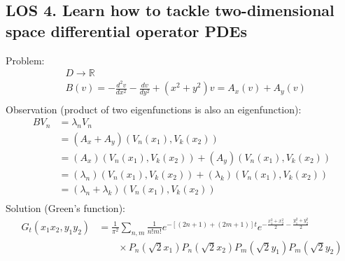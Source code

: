 \documentclass[12pt, a4paper]{article}
\begin{document}
\subsection*{LOS 4. Learn how to tackle two-dimensional space differential operator PDEs}
Problem:
\begin{align*}
    &D \rightarrow \mathbb{R}\\
    &B(v) = -\frac{d^2v}{dx^2}-\frac{dv}{dy^2} + (x^2+y^2)v = A_x(v) +  A_y(v)\\
\end{align*}
Observation (product of two eigenfunctions is also an  eigenfunction):
\begin{align*}
    BV_n &= \lambda_n  V_n\\
    &=(A_x +  A_y)(V_n(x_1), V_k(x_2))\\
    &=(A_x)(V_n(x_1), V_k(x_2)) + (A_y)(V_n(x_1), V_k(x_2))\\
    &=(\lambda_n)(V_n(x_1), V_k(x_2)) + (\lambda_k)(V_n(x_1), V_k(x_2))\\
    &=(\lambda_n+\lambda_k)(V_n(x_1), V_k(x_2))\\
\end{align*}
Solution (Green's function):
\begin{align*}
    G_t(x_1x_2, y_1y_2) &= \frac{1}{\pi^2}\sum_{n, m} \frac{1}{n!m!}e^{-[(2n+1) + (2m+1)]t}e^{-\frac{x_1^2+x_2^2}{2}-\frac{y_1^2+y_2^2}{2}}\\
    &\qquad \times P_n(\sqrt{2}x_1)P_n(\sqrt{2}x_2)P_m(\sqrt{2}y_1)P_m(\sqrt{2}y_2)\\
\end{align*}
\vspace{0.3em}
\end{document}
